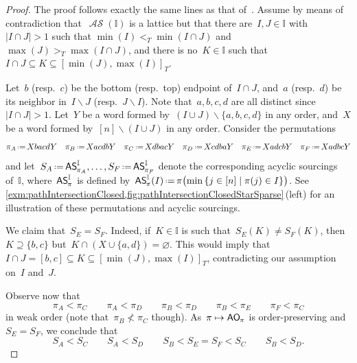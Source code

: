 \documentclass{amsart}
\theoremstyle{definition}
\newcommand{\set}[2]{\left\{ #1 \;\middle|\; #2 \right\}} %
\newcommand{\ssm}{\smallsetminus} %
\newcommand{\eqdef}{\mbox{\,\raisebox{0.2ex}{\scriptsize\ensuremath{\mathrm:}}\ensuremath{=}\,}} %
\newcommand{\mymap}[2]{\mathsf{#1}_{\hspace{-.7pt}#2}}
\newcommand{\aorn}[1]{\mymap{AO}{#1}}  %
\DeclareMathOperator{\ASour}{\mathcal{AS}}  %
\newcommand{\asour}[1]{\mymap{AS}{#1}}  %
\newcommand{\II}{\mathbb I} %
\begin{document}
\begin{proof}
The proof follows exactly the same lines as that of~\cite[Prop.~4.6]{BergeronPilaud}.
Assume by means of contradiction that~$\ASour(\II)$ is a lattice but that there are~$I,J\in \II$ with~$|I\cap J|> 1$ such that $\min(I) <_T \min(I\cap J)$ and  $\max(J) >_T \max(I\cap J)$, and there is no~$K \in \II$ such that ${I \cap J \subseteq K \subseteq [\min(J) , \max(I)]_T}$.

Let~$b$ (resp.~$c$) be the bottom (resp.~top) endpoint of~$I \cap J$, and~$a$ (resp.~$d$) be its neighbor in~$I \ssm J$ (resp.~$J \ssm I$).
Note that~$a,b,c,d$ are all distinct since~$|I \cap J| > 1$.
Let~$Y$ be a word formed by~$(I \cup J) \ssm \{a,b,c,d\}$ in any order, and~$X$ be a word formed by~$[n] \ssm (I \cup J)$ in any order.
Consider the permutations
\[
\pi_A \eqdef XbacdY
\quad
\pi_B \eqdef XacdbY
\quad
\pi_C \eqdef XdbacY
\quad
\pi_D \eqdef XcdbaY
\quad
\pi_E \eqdef XadcbY
\quad
\pi_F \eqdef XadbcY
\]
and let~$S_A \eqdef \asour{\pi_A}^\II, \dots, S_F \eqdef \asour{\pi_F}^\II$ denote the corresponding acyclic sourcings of~$\II$, where~$\asour{\pi}^\II$ is defined by~$\asour{\pi}^\II(I) \eqdef \pi\bigl(\min \set{j \in [n]}{\pi(j) \in I} \bigr)$.
See \cref{exm:pathIntersectionClosed,fig:pathIntersectionClosedStarSparse}\,(left) for an illustration of these permutations and acyclic sourcings.

We claim that~$S_E = S_F$.
Indeed, if~$K \in \II$ is such that~$S_E(K) \ne S_F(K)$, then~$K \supseteq \{b,c\}$ but~${K \cap (X \cup \{a,d\}) = \varnothing}$.
This would imply that~${I \cap J = [b,c] \subseteq K \subseteq [\min(J) , \max(I)]_T}$, contradicting our assumption on~$I$ and~$J$.

Observe now that
\[
\pi_A < \pi_C
\qquad
\pi_A < \pi_D
\qquad
\pi_B < \pi_D
\qquad
\pi_B < \pi_E
\qquad
\pi_F < \pi_C
\]
in weak order (note that~$\pi_B \not< \pi_C$ though).
As~$\pi \mapsto \aorn{\pi}$ is order-preserving and~$S_E = S_F$, we conclude that
\[
S_A < S_C
\qquad
S_A < S_D
\qquad
S_B < S_E = S_F < S_C
\qquad
S_B < S_D.
\]


\end{proof}
\end{document}

